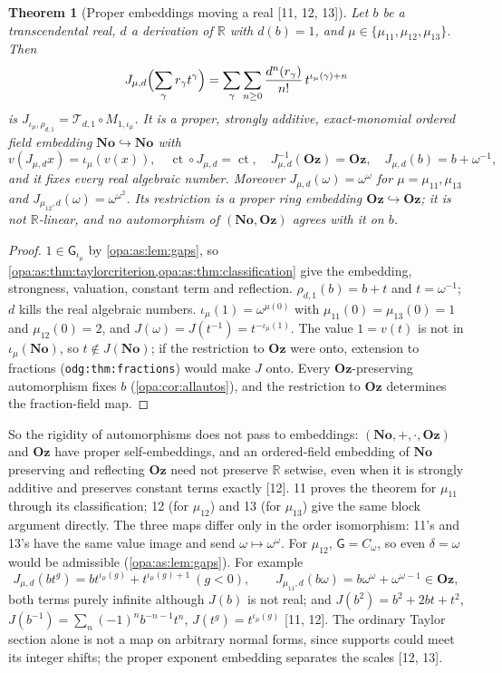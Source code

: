 \documentclass[11pt,oneside]{article}
\numberwithin{equation}{section}
\newtheorem{theorem}{Theorem}[section]
\theoremstyle{definition}
\theoremstyle{remark}
\newcommand{\No}{\mathbf{No}}
\newcommand{\Oz}{\mathbf{Oz}}
\newcommand{\R}{\mathbb R}
\newcommand{\ct}{\operatorname{ct}}
\newcommand{\src}[1]{\textup{\textsf{\small[#1]}}}
\newcommand{\lbl}[1]{\nolinkurl{#1}}
\newcommand{\gap}{\mathsf G}
\begin{document}
\begin{theorem}[Proper embeddings moving a real \src{11, 12, 13}]\label{opa:as:thm:explicit}
Let $b$ be a transcendental real, $d$ a derivation of $\R$ with $d(b)=1$, and
$\mu\in\{\mu_{11},\mu_{12},\mu_{13}\}$. Then
\begin{equation}\label{opa:as:eq:explicit}
 J_{\mu,d}\Bigl(\sum_\gamma r_\gamma t^\gamma\Bigr)=\sum_\gamma\sum_{n\ge0}\frac{d^n(r_\gamma)}{n!}\,
 t^{\iota_\mu(\gamma)+n}
\end{equation}
is $J_{\iota_\mu,\rho_{d,1}}=\mathcal T_{d,1}\circ M_{1,\iota_\mu}$. It is a proper, strongly additive,
exact-monomial ordered field embedding $\No\hookrightarrow\No$ with
\[
 v(J_{\mu,d}x)=\iota_\mu(v(x)),\quad \ct\circ J_{\mu,d}=\ct,\quad J_{\mu,d}^{-1}(\Oz)=\Oz,\quad
 J_{\mu,d}(b)=b+\omega^{-1},
\]
and it fixes every real algebraic number. Moreover $J_{\mu,d}(\omega)=\omega^\omega$ for
$\mu=\mu_{11},\mu_{13}$ and $J_{\mu_{12},d}(\omega)=\omega^{\omega^2}$. Its restriction is a proper ring
embedding $\Oz\hookrightarrow\Oz$; it is not $\R$-linear, and no automorphism of $(\No,\Oz)$ agrees with
it on $b$.
\end{theorem}
\begin{proof}
$1\in\gap_{\iota_\mu}$ by \cref{opa:as:lem:gaps}, so \cref{opa:as:thm:taylorcriterion,opa:as:thm:classification}
give the embedding, strongness, valuation, constant term and reflection. $\rho_{d,1}(b)=b+t$ and
$t=\omega^{-1}$; $d$ kills the real algebraic numbers. $\iota_\mu(1)=\omega^{\mu(0)}$ with $\mu_{11}(0)=\mu_{13}(0)=1$
and $\mu_{12}(0)=2$, and $J(\omega)=J(t^{-1})=t^{-\iota_\mu(1)}$. The value $1=v(t)$ is not in
$\iota_\mu(\No)$, so $t\notin J(\No)$; if the restriction to $\Oz$ were onto, extension to fractions
(\lbl{odg:thm:fractions}) would make $J$ onto. Every $\Oz$-preserving automorphism fixes $b$
(\cref{opa:cor:allautos}), and the restriction to $\Oz$ determines the fraction-field map.
\end{proof}

So the rigidity of automorphisms does not pass to embeddings: $(\No,+,\cdot,\Oz)$ and $\Oz$ have
proper self-embeddings, and an ordered-field embedding of $\No$ preserving and reflecting $\Oz$ need
not preserve $\R$ setwise, even when it is strongly additive and preserves constant terms exactly
\src{12}. 11 proves the theorem for $\mu_{11}$ through its classification; 12 (for $\mu_{12}$) and 13
(for $\mu_{13}$) give the same block argument directly. The three maps differ only in the order isomorphism: 11's and
13's have the same value image and send $\omega\mapsto\omega^\omega$. For $\mu_{12}$, $\gap=C_\omega$, so even
$\delta=\omega$ would be admissible (\cref{opa:as:lem:gaps}). For example
\[
 J_{\mu,d}(bt^g)=bt^{\iota_\mu(g)}+t^{\iota_\mu(g)+1}\ (g<0),\qquad
 J_{\mu_{11},d}(b\omega)=b\omega^\omega+\omega^{\omega-1}\in\Oz,
\]
both terms purely infinite although $J(b)$ is not real; and
$J(b^2)=b^2+2bt+t^2$, $J(b^{-1})=\sum_n(-1)^nb^{-n-1}t^n$, $J(t^g)=t^{\iota_\mu(g)}$ \src{11, 12}.
The ordinary Taylor section alone is not a map on arbitrary normal forms, since supports could meet
its integer shifts; the proper exponent embedding separates the scales \src{12, 13}.
\end{document}
